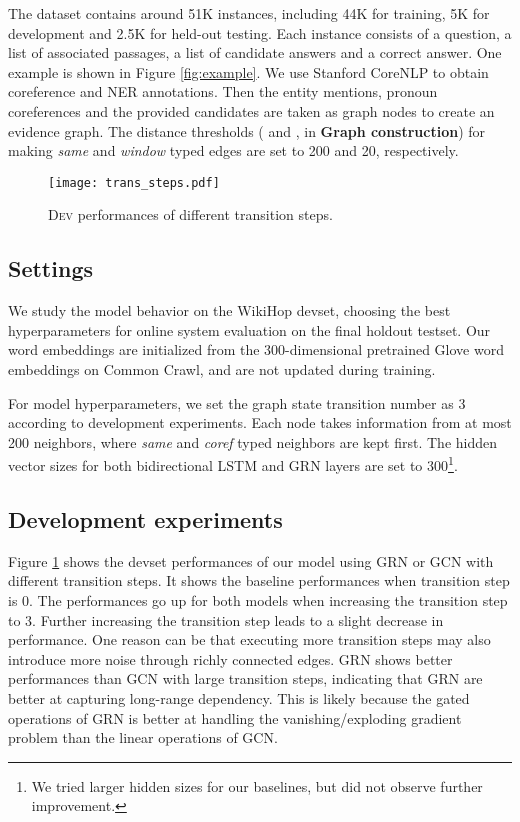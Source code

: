 \documentclass[letterpaper]{article}
\begin{document}
The dataset contains around 51K instances, including 44K for training, 5K for development and 2.5K for held-out testing.
Each instance consists of a question, a list of associated passages, a list of candidate answers and a correct answer.
One example is shown in Figure \ref{fig:example}.
We use Stanford CoreNLP \citep{manning-EtAl:2014:P14-5} to obtain coreference and NER annotations. 
Then the entity mentions, pronoun coreferences and the provided candidates are taken as graph nodes to create an evidence graph.
The distance thresholds ( and , in \textbf{Graph construction}) for making \emph{same} and \emph{window} typed edges are set to 200 and 20, respectively.



\begin{figure}
\centering
\texttt{[image: trans\_steps.pdf]}
\caption{\textsc{Dev} performances of different transition steps.}
\label{fig:dev_steps}
\end{figure}


\subsection{Settings}
We study the model behavior on the WikiHop devset, choosing the best hyperparameters for online system evaluation on the final holdout testset.
Our word embeddings are initialized from the 300-dimensional pretrained Glove word embeddings \citep{pennington2014glove} on Common Crawl, and are not updated during training.

For model hyperparameters, we set the graph state transition number as 3 according to development experiments.
Each node takes information from at most 200 neighbors, where \emph{same} and \emph{coref} typed neighbors are kept first. 
The hidden vector sizes for both bidirectional LSTM and GRN layers are set to 300\footnote{We tried larger hidden sizes for our baselines, but did not observe further improvement.}.


\subsection{Development experiments}


Figure \ref{fig:dev_steps} shows the devset performances of our model using GRN or GCN with different transition steps.
It shows the baseline performances when transition step is 0.
The performances go up for both models when increasing the transition step to 3.
Further increasing the transition step leads to a slight decrease in performance.
One reason can be that executing more transition steps may also introduce more noise through richly connected edges.
GRN shows better performances than GCN with large transition steps, indicating that GRN are better at capturing long-range dependency.
This is likely because the gated operations of GRN is better at handling the vanishing/exploding gradient problem than the linear operations of GCN.
\end{document}
